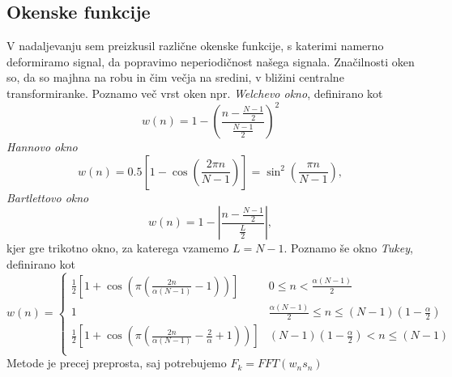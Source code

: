 \documentclass[11pt, a4paper]{article}
\begin{document}
\subsection{Okenske funkcije}
V nadaljevanju sem preizkusil različne okenske funkcije, s katerimi namerno deformiramo signal, da popravimo neperiodičnost našega signala. Značilnosti oken so, da so majhna na robu in čim večja na sredini, v bližini centralne transformiranke. Poznamo več vrst oken npr. \newline \textit{Welchevo okno}, definirano kot
\begin{equation}
w(n)=1 - \left(\frac{n-\frac{N-1}{2}}{\frac{N-1}{2}}\right)^2
\end{equation}
\textit{Hannovo okno}
\begin{equation}
w(n) = 0.5 \left[1 - \cos \left ( \frac{2 \pi n}{N-1} \right) \right] = \sin^2 \left ( \frac{\pi n}{N-1} \right), 
\end{equation}
 \textit{Bartlettovo okno}
\begin{equation}
w(n)=1 - \left|\frac{n-\frac{N-1}{2}}{\frac{L}{2}}\right|,
\end{equation}
kjer gre trikotno okno, za katerega vzamemo $L=N-1$. Poznamo še okno \textit{Tukey}, definirano kot
\begin{equation}
w(n) = \left\{ \begin{matrix}
\frac{1}{2} \left[1+\cos \left(\pi \left( \frac{2 n}{\alpha (N-1)}-1 \right) \right) \right]
& 0 \leqslant n < \frac{\alpha (N-1)}{2} \\ 
1 & \frac{\alpha (N-1)}{2}\leqslant n \leqslant (N-1) (1 - \frac{\alpha}{2}) \\ 
\frac{1}{2} \left[1+\cos \left(\pi \left( \frac{2 n}{\alpha (N-1)}- \frac{2}{\alpha} + 1 \right) \right) \right]
& (N-1) (1 - \frac{\alpha}{2}) < n \leqslant  (N-1) \\
\end{matrix} \right.
\end{equation}
Metode je precej preprosta, saj potrebujemo $F_k = FFT(w_n s_n)$
\end{document}
